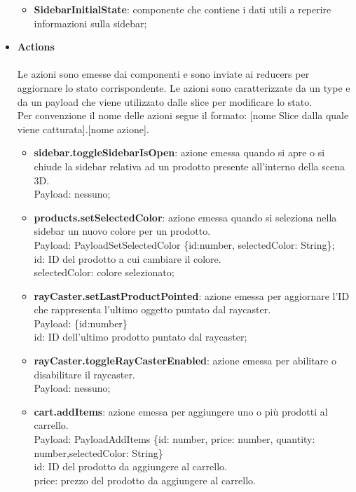 \begin{itemize}
\begin{itemize}
			\item \textbf{SidebarInitialState}: componente che contiene i dati utili a reperire informazioni sulla sidebar;
		\end{itemize}
		\item \textbf{\large Actions}
		\\\\
		Le azioni sono emesse dai componenti e sono inviate ai reducers per aggiornare lo stato corrispondente.
		Le azioni sono caratterizzate da un type e da un payload che viene utilizzato dalle slice per modificare lo stato.
		\\
		Per convenzione il nome delle azioni segue il formato: [nome Slice dalla quale viene catturata].[nome azione].
		\begin{itemize}
			\item \textbf{sidebar.toggleSidebarIsOpen}: azione emessa quando si apre o si chiude la sidebar relativa ad un prodotto presente 
			all'interno della scena 3D.
			\\
			Payload: nessuno;
			\item \textbf{products.setSelectedColor}: azione emessa quando si seleziona nella sidebar un nuovo colore per un prodotto.
			\\
			Payload: PayloadSetSelectedColor \{id:number, selectedColor: String\};
			\\
			id: ID del prodotto a cui cambiare il colore.
			\\
			selectedColor: colore selezionato;
			\item \textbf{rayCaster.setLastProductPointed}: azione emessa per aggiornare l'ID che rappresenta l'ultimo oggetto puntato dal raycaster.
			\\
			Payload: \{id:number\}
			\\
			id: ID dell'ultimo prodotto puntato dal raycaster;
			\item \textbf{rayCaster.toggleRayCasterEnabled}: azione emessa per abilitare o disabilitare il raycaster.
			\\
			Payload: nessuno;
			\item \textbf{cart.addItems}: azione emessa per aggiungere uno o più prodotti al carrello.
			\\
			Payload: PayloadAddItems \{id: number, price: number, quantity: number,selectedColor: String\}
			\\
			id: ID del prodotto da aggiungere al carrello.
			\\
			price: prezzo del prodotto da aggiungere al carrello.
			\\

\end{itemize}
\end{itemize}
